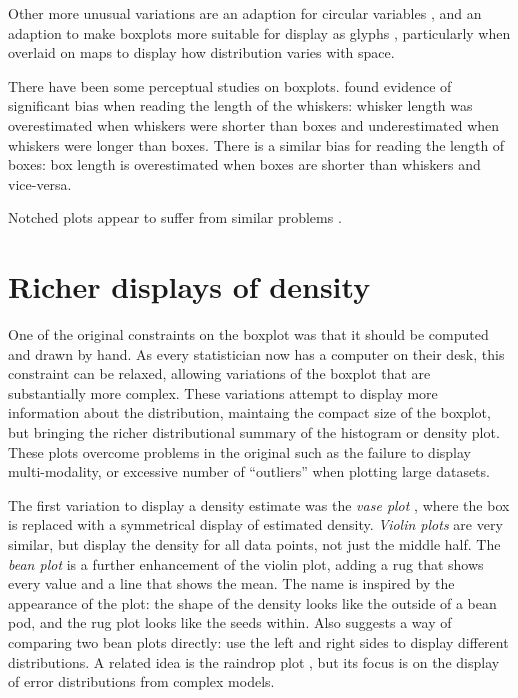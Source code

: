 \documentclass[oneside]{article}
\begin{document}
Other more unusual variations are an adaption for circular variables \citep{abuzaid:2011}, and an adaption to make boxplots more suitable for display as glyphs \citet{carr:1998}, particularly when overlaid on maps to display how distribution varies with space.

There have been some perceptual studies on boxplots. \citet{behrens:1990} found evidence of significant bias when reading the length of the whiskers: whisker length was overestimated when whiskers were shorter than boxes and underestimated when whiskers were longer than boxes. There is a similar bias for reading the length of boxes: box length is overestimated when boxes are shorter than whiskers and vice-versa.

Notched plots appear to suffer from similar problems \citep{wells:1996}.

\section{Richer displays of density}
\label{sec:density}

One of the original constraints on the boxplot was that it should be computed and drawn by hand. As every statistician now has a computer on their desk, this constraint can be relaxed, allowing variations of the boxplot that are substantially more complex. These variations attempt to display more information about the distribution, maintaing the compact size of the boxplot, but bringing the richer distributional summary of the histogram or density plot. These plots overcome problems in the original such as the failure to display multi-modality, or excessive number of ``outliers'' when plotting large datasets.

The first variation to display a density estimate was the \emph{vase plot} \citep{Benjamini1988}, where the box is replaced with a symmetrical display of estimated density. \emph{Violin plots} \citep{Hintze1998} are very similar, but display the density for all data points, not just the middle half. The \emph{bean plot} \citep{beanplot} is a further enhancement of the violin plot, adding a rug that shows every value and a line that shows the mean. The name is inspired by the appearance of the plot: the shape of the density looks like the outside of a bean pod, and the rug plot looks like the seeds within. Also suggests a way of comparing two bean plots directly: use the left and right sides to display different distributions. A related idea is the raindrop plot \citep{barrowman:2003}, but its focus is on the display of error distributions from complex models.
\end{document}
